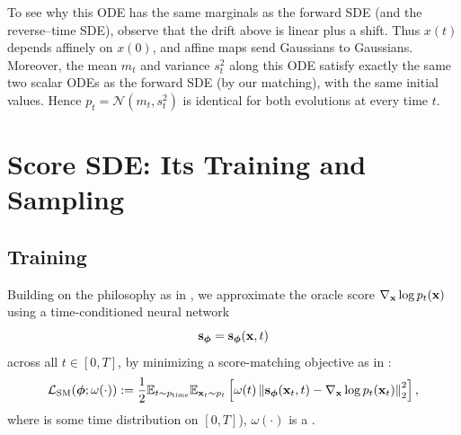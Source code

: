 To see why this ODE has the same marginals as the forward SDE (and the reverse–time SDE), observe that the drift above is linear plus a shift. Thus $x(t)$ depends affinely on $x(0)$, and affine maps send Gaussians to Gaussians. Moreover, the mean $m_t$ and variance $s_t^2$ along this ODE satisfy exactly the same two scalar ODEs as the forward SDE (by our matching), with the same initial values. Hence $p_t=\mathcal N(m_t,s_t^2)$ is identical for both evolutions at every time $t$.





\clearpage
\newpage




\section{Score SDE: Its Training and Sampling}\label{sec:scoresde-training-sampling}

\subsection{Training}\label{subsec:sde-train}
Building on the philosophy as in , we approximate the oracle score $\nabla_{{\mathbf{x}}} \log p_t({\mathbf{x}})$ using a time-conditioned neural network 
\[
\mathbf{s}_{\bm{\phi}} = \mathbf{s}_{\bm{\phi}}({\mathbf{x}}, t)
\]
across all $t\in[0,T]$, by minimizing a score-matching objective as in :
\begin{equation*}
\mathcal{L}_{\text{SM}}(\bm{\phi}; \omega(\cdot)) := \frac{1}{2} \mathbb{E}_{t\sim p_{\text{time}}}  \mathbb{E}_{{\mathbf{x}}_t \sim p_t}\left[\omega(t) \left\|\mathbf{s}_{\bm{\phi}}({\mathbf{x}}_t, t) - \nabla_{{\mathbf{x}}} \log p_t({\mathbf{x}}_t)\right\|_2^2\right],
\end{equation*}
where  is some time distribution  on $[0,T]$), $\omega(\cdot)$ is a .

